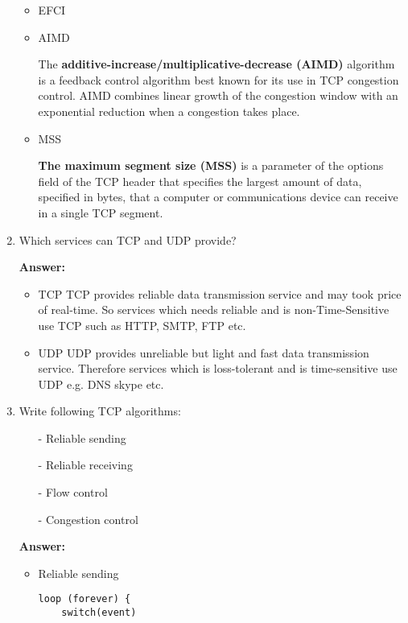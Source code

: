 \begin{enumerate}
\begin{itemize}
        \item EFCI
        
        \item AIMD
        
        The \textbf{additive-increase/multiplicative-decrease (AIMD)} algorithm is a feedback control algorithm best known for its use in TCP congestion control. AIMD combines linear growth of the congestion window with an exponential reduction when a congestion takes place.
        
        \item MSS
        
        \textbf{The maximum segment size (MSS)} is a parameter of the options field of the TCP header that specifies the largest amount of data, specified in bytes, that a computer or communications device can receive in a single TCP segment.
        
    \end{itemize}
    
    \item Which services can TCP and UDP provide?
    
    \textbf{Answer:}
    
    \begin{itemize}
        \item TCP
        TCP provides reliable data transmission service and may took price of real-time. So services which needs reliable and is non-Time-Sensitive use TCP such as HTTP, SMTP, FTP etc.
        
        \item UDP
        UDP provides unreliable but light and fast data transmission service. Therefore services which is loss-tolerant and is time-sensitive use UDP e.g. DNS skype etc.
        
    \end{itemize}
    
    \item Write following TCP algorithms:
    \begin{itemize}
        \item[-] Reliable sending
        \item[-] Reliable receiving
        \item[-] Flow control
        \item[-] Congestion control
    \end{itemize}
    
    \textbf{Answer:}
    
    \begin{itemize}
        \item Reliable sending
        \begin{lstlisting}
loop (forever) {
    switch(event)
    

\end{lstlisting}
\end{itemize}
\end{enumerate}
